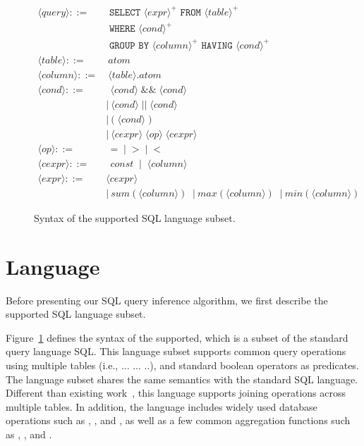 \newcommand{\q}{\langle query\rangle}
\newcommand{\db}{\langle db\rangle}
\newcommand{\pat}{\langle pat\rangle}
\newcommand{\bug}{\langle bug\rangle}
\newcommand{\dist}{\langle distance\rangle}
\newcommand{\sem}[1]{\llbracket #1\rrbracket}
\newcommand{\lit}[1]{\texttt{#1}}

\newcommand{\column}{\langle column\rangle}
\newcommand{\dbtable}{\langle table\rangle}
\newcommand{\cond}{\langle cond\rangle}
\newcommand{\op}{\langle op\rangle}
\newcommand{\e}{\langle expr\rangle}
\newcommand{\ce}{\langle cexpr\rangle}

\begin{figure}[t]
\footnotesize%
\begin{align*}
\q ::= {} 
	& \texttt{ SELECT } \e^+ \texttt{ FROM } \dbtable^+ \\
        & \texttt{ WHERE } \cond^+ \\ 
	&  \texttt{ GROUP BY } \column^+ \texttt{ HAVING } \cond^+\\
\dbtable::= {} &\ atom \\
\column ::= {} &\ \dbtable.atom\\
\cond ::= {} &\ \ \cond \;\texttt{\&\&}\; \cond \\ 
    & |\ \cond \;\texttt{||}\; \cond \\
    & |\ \texttt{(}\;\cond\;\texttt{)} \\
    & |\ \ce \;\op\; \ce \\
\op ::= {} &\ \ \texttt{=} \;\;|\;\; \texttt{>}  \;\;|\;\; \texttt{<}\\
\ce ::= {} &\ \ const \;\;|\;\; \column  \;\; \\
\e ::= {} & \ce \\
    & |\ sum(\column) \;\;|\ max(\column) \;\;|\ min(\column) 
\end{align*}
\normalsize%
\caption{Syntax of the supported SQL language subset.}
\label{fig:syntax}
\end{figure}


\section{Language}
\label{sec:langsubset}

Before presenting our SQL query inference algorithm, we first describe
the supported SQL language subset.

Figure~\ref{fig:syntax} defines the syntax of the supported, which
is a subset of the standard query language SQL. This language subset
supports common query operations using multiple tables (i.e.,
 ... ... ..), and standard
boolean operators as predicates. The language
subset shares the same semantics with the standard SQL language.
Different than existing work~\cite{DasSarma:2010}, this language supports
joining operations across multiple tables.  In addition, the language includes
widely used database operations such as ,
, and , as
well as a few common aggregation functions such as ,
, and .

